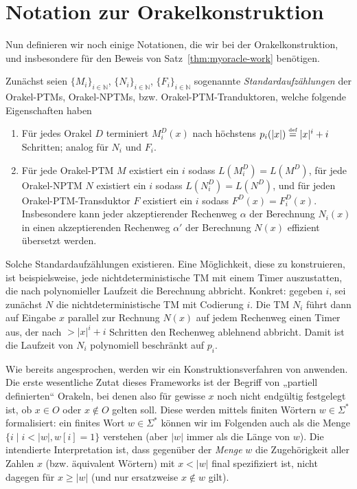 \section{Notation zur Orakelkonstruktion}\label{sec:oracle-notation}

Nun definieren wir noch einige Notationen, die wir bei der Orakelkonstruktion, und insbesondere für den Beweis von Satz~\ref{thm:myoracle-work} benötigen.

Zunächst seien $\{M_i\}_{i\in \mathbb N}$, $\{N_i\}_{i\in \mathbb N}$, $\{F_i\}_{i\in\mathbb N}$ sogenannte \emph{Standardaufzählungen} der Orakel-PTMs, Orakel-NPTMs, bzw. Orakel-PTM-Tranduktoren, welche folgende Eigenschaften haben
\begin{enumerate}[label=\arabic*.]
    \item Für jedes Orakel $D$ terminiert $M_i^D(x)$ nach höchstens $p_i(|x|)\stackrel{\text{{\normalfont\tiny def}}}{=} |x|^i+i$ Schritten; analog für $N_i$ und $F_i$.
    \item Für jede Orakel-PTM $M$ existiert ein $i$ sodass $L(M^D_i)=L(M^D)$, 
        für jede Orakel-NPTM $N$ existiert ein $i$ sodass $L(N^D_i)=L(N^D)$, und
        für jeden Orakel-PTM-Transduktor $F$ existiert ein $i$ sodass $F^D(x)=F_i^D(x)$.
        Insbesondere kann jeder akzeptierender Rechenweg $\alpha$ der Berechnung $N_i(x)$ in einen akzeptierenden Rechenweg $\alpha'$ der Berechnung $N(x)$ effizient übersetzt werden.
\end{enumerate}
Solche Standardaufzählungen existieren. Eine Möglichkeit, diese zu konstruieren, ist beispielsweise, jede nichtdeterministische TM mit einem Timer auszustatten, die nach polynomieller Laufzeit die Berechnung abbricht. Konkret: gegeben $i$, sei zunächst $N$ die nichtdeterministische TM mit Codierung $i$. Die TM $N_i$ führt dann auf Eingabe $x$ parallel zur Rechnung $N(x)$ auf jedem Rechenweg einen Timer aus, der nach $>|x|^i+i$ Schritten den Rechenweg ablehnend abbricht.
Damit ist die Laufzeit von $N_i$ polynomiell beschränkt auf $p_i$.

Wie bereits angesprochen, werden wir ein Konstruktionsverfahren von \citeauthor{dose_np-completeness_2019} anwenden. Die erste wesentliche Zutat dieses Frameworks ist der Begriff von „partiell definierten“ Orakeln, bei denen also für gewisse $x$ noch nicht endgültig festgelegt ist, ob $x\in O$ oder $x\not\in O$ gelten soll.
Diese werden mittels finiten Wörtern $w\in\Sigma^*$ formalisiert:
ein finites Wort $w\in\Sigma^*$ können wir im Folgenden auch als die Menge $\{ i \mid i<|w|, w[i] = 1 \}$ verstehen (aber $|w|$ immer als die Länge von $w$).
Die intendierte Interpretation ist, dass gegenüber der \emph{Menge} $w$ die Zugehörigkeit aller Zahlen $x$ (bzw. äquivalent Wörtern) mit $x<|w|$ final spezifiziert ist, nicht dagegen für $x\geq|w|$ (und nur ersatzweise $x\not\in w$ gilt).

